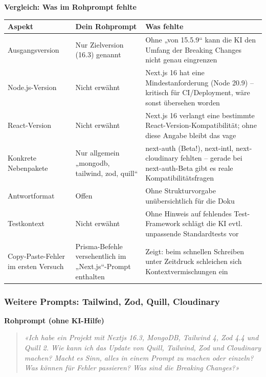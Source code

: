 \documentclass[11pt,a4paper]{article}
\newcommand{\minihead}[1]{\par\needspace{5\baselineskip}\noindent\textbf{#1}\par\nobreak}
\let\oldsubsubsection\subsubsection
\renewcommand{\subsubsection}{\needspace{6\baselineskip}\oldsubsubsection}
\begin{document}
\minihead{Vergleich: Was im Rohprompt fehlte}
\begin{center}
\small
\begin{tabularx}{\textwidth}{>{\raggedright\arraybackslash}p{3cm} >{\raggedright\arraybackslash}X >{\raggedright\arraybackslash}X}
\toprule
\textbf{Aspekt} & \textbf{Dein Rohprompt} & \textbf{Was fehlte} \\
\midrule
Ausgangsversion & Nur Zielversion (16.3) genannt & Ohne „von 15.5.9“ kann die KI den Umfang der Breaking Changes nicht genau eingrenzen \\
Node.js-Version & Nicht erwähnt & Next.js 16 hat eine Mindestanforderung (Node 20.9) – kritisch für CI/Deployment, wäre sonst übersehen worden \\
React-Version & Nicht erwähnt & Next.js 16 verlangt eine bestimmte React-Version-Kompatibilität; ohne diese Angabe bleibt das vage \\
Konkrete Nebenpakete & Nur allgemein „mongodb, tailwind, zod, quill“ & next-auth (Beta!), next-intl, next-cloudinary fehlten – gerade bei next-auth-Beta gibt es reale Kompatibilitätsfragen \\
Antwortformat & Offen & Ohne Strukturvorgabe unübersichtlich für die Doku \\
Testkontext & Nicht erwähnt & Ohne Hinweis auf fehlendes Test-Framework schlägt die KI evtl. unpassende Standardtests vor \\
Copy-Paste-Fehler im ersten Versuch & Prisma-Befehle versehentlich im „Next.js“-Prompt enthalten & Zeigt: beim schnellen Schreiben unter Zeitdruck schleichen sich Kontextvermischungen ein \\
\bottomrule
\end{tabularx}
\end{center}

\subsubsection{Weitere Prompts: Tailwind, Zod, Quill, Cloudinary}
\minihead{Rohprompt (ohne KI-Hilfe)}
\begin{quote}
\textit{«Ich habe ein Projekt mit Nextjs 16.3, MongoDB, Tailwind 4, Zod 4.4 und Quill 2. Wie kann ich das Update von Quill, Tailwind, Zod und Cloudinary machen? Macht es Sinn, alles in einem Prompt zu machen oder einzeln? Was können für Fehler passieren? Was sind die Breaking Changes?»}
\end{quote}
\end{document}

